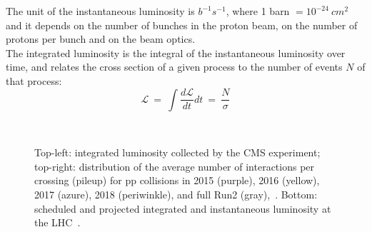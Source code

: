 The unit of the instantaneous luminosity is $b^{-1}s^{-1}$, where 1
barn $= 10^{-24} \ cm^2$ and it depends on the number of bunches in
the proton beam, on the number of protons per bunch and on the beam
optics. \\
The integrated luminosity is the integral of the instantaneous
luminosity over time, and relates the cross section of a
given process to the number of events $N$ of that process:
\begin{equation}
\label{eq:intelumi}
\mathcal{L} \:=\: \int \frac{d\mathcal{L}}{dt} dt \: = \: \frac{N}{\sigma}
\end{equation}


\begin{figure}[h]
  \noindent
  \\
  \caption{Top-left: integrated luminosity collected by the CMS
    experiment; top-right: distribution of the average number of
    interactions per crossing (pileup) for pp collisions in 2015
    (purple), 2016 (yellow), 2017 (azure), 2018 (periwinkle), and
    full Run2 (gray),~\cite{webpage_lumi}. Bottom: scheduled and
    projected integrated and instantaneous luminosity at the LHC~\cite{webpage_lhc}.}
  \label{fig:lumi}
\end{figure}

